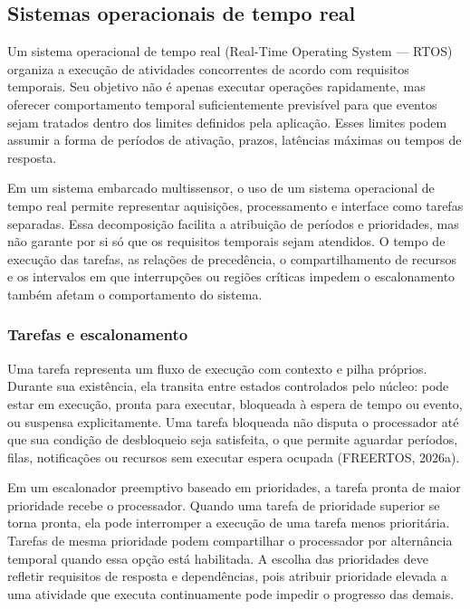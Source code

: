 \documentclass[a4paper,12pt]{article}
\begin{document}
\subsection{Sistemas operacionais de tempo real}


Um sistema operacional de tempo real (Real-Time Operating System --- RTOS) organiza a execu\c{c}\~ao de atividades concorrentes de acordo com requisitos temporais. Seu objetivo n\~ao \'e apenas executar opera\c{c}\~oes rapidamente, mas oferecer comportamento temporal suficientemente previs\'ivel para que eventos sejam tratados dentro dos limites definidos pela aplica\c{c}\~ao. Esses limites podem assumir a forma de per\'iodos de ativa\c{c}\~ao, prazos, lat\^encias m\'aximas ou tempos de resposta.


Em um sistema embarcado multissensor, o uso de um sistema operacional de tempo real permite representar aquisi\c{c}\~oes, processamento e interface como tarefas separadas. Essa decomposi\c{c}\~ao facilita a atribui\c{c}\~ao de per\'iodos e prioridades, mas n\~ao garante por si s\'o que os requisitos temporais sejam atendidos. O tempo de execu\c{c}\~ao das tarefas, as rela\c{c}\~oes de preced\^encia, o compartilhamento de recursos e os intervalos em que interrup\c{c}\~oes ou regi\~oes cr\'iticas impedem o escalonamento tamb\'em afetam o comportamento do sistema.


\subsubsection{Tarefas e escalonamento}


Uma tarefa representa um fluxo de execu\c{c}\~ao com contexto e pilha pr\'oprios. Durante sua exist\^encia, ela transita entre estados controlados pelo n\'ucleo: pode estar em execu\c{c}\~ao, pronta para executar, bloqueada \`a espera de tempo ou evento, ou suspensa explicitamente. Uma tarefa bloqueada n\~ao disputa o processador at\'e que sua condi\c{c}\~ao de desbloqueio seja satisfeita, o que permite aguardar per\'iodos, filas, notifica\c{c}\~oes ou recursos sem executar espera ocupada (FREERTOS, 2026a).


Em um escalonador preemptivo baseado em prioridades, a tarefa pronta de maior prioridade recebe o processador. Quando uma tarefa de prioridade superior se torna pronta, ela pode interromper a execu\c{c}\~ao de uma tarefa menos priorit\'aria. Tarefas de mesma prioridade podem compartilhar o processador por altern\^ancia temporal quando essa op\c{c}\~ao est\'a habilitada. A escolha das prioridades deve refletir requisitos de resposta e depend\^encias, pois atribuir prioridade elevada a uma atividade que executa continuamente pode impedir o progresso das demais.
\end{document}
